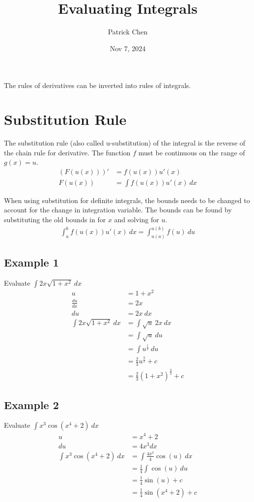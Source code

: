 \documentclass{article}
\title{Evaluating Integrals}
\author{Patrick Chen}
\date{Nov 7, 2024}
\theoremstyle{mytheoremstyle}
\theoremstyle{mytheoremstyle}
\theoremstyle{myproblemstyle}
\begin{document}
    \maketitle
    The rules of derivatives can be inverted into rules of integrals.

    \section*{Substitution Rule}
    The substitution rule (also called u-substitution) of the integral is the
    reverse of the chain rule for derivative. The function $f$ must be
    continuous on the range of $g(x)=u$.
    \begin{align*}
        (F(u(x)))' &= f(u(x))u'(x) \\
        F(u(x)) &= \int f(u(x))u'(x) \ dx
    \end{align*}

    When using substitution for definite integrals, the bounds needs to be
    changed to account for the change in integration variable. The bounds can be
    found by substituting the old bounds in for $x$ and solving for $u$.
    \begin{align*}
        \int_{a}^{b} f(u(x)) u'(x) \ dx
        = \int_{u(a)}^{u(b)} f(u) \ du
    \end{align*}

    \subsection*{Example 1}
    Evaluate $\int 2x\sqrt{1+x^2} \ dx$
    \begin{align*}
        u &= 1+x^2 \\
        \frac{du}{dx} &= 2x \\
        du &= 2x\ dx \\
        \int 2x\sqrt{1+x^2} \ dx &= \int \sqrt{u}\ 2x\ dx \\
        &= \int \sqrt{u} \ du \\
        &= \int u^{\frac{1}{2}} \ du \\
        &= \frac{2}{3} u^{\frac{3}{2}} + c \\
        &= \frac{2}{3} (1+x^2)^{\frac{3}{2}} + c
    \end{align*}

    \subsection*{Example 2}
    Evaluate $\int x^3\cos(x^4+2) \ dx$
    \begin{align*}
        u  &= x^4 + 2 \\
        du &= 4x^3 dx \\
        \int x^3\cos(x^4+2) \ dx
        &= \int \frac{4x^3}{4} \cos(u) \ dx \\
        &= \frac{1}{4} \int \cos(u) \ du \\
        &= \frac{1}{4} \sin(u) + c \\
        &= \frac{1}{4} \sin(x^4 + 2) + c
    \end{align*}
\end{document}
